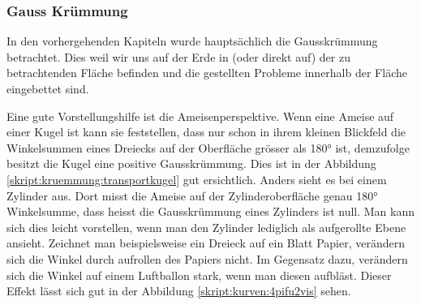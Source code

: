 \begin{refsection}




\subsubsection{Gauss Krümmung}
%
%
%
In den vorhergehenden Kapiteln wurde hauptsächlich die Gausskrümmung betrachtet.
Dies weil wir uns auf der Erde in (oder direkt auf) der zu betrachtenden Fläche befinden und die gestellten Probleme innerhalb der Fläche eingebettet sind.   

Eine gute Vorstellungshilfe ist die Ameisenperspektive. 
Wenn eine Ameise auf einer Kugel ist kann sie feststellen, dass nur schon in ihrem kleinen Blickfeld die Winkelsummen eines Dreiecks auf der Oberfläche grösser als 180° ist, demzufolge besitzt die Kugel eine positive Gausskrümmung. Dies ist in der Abbildung \ref{skript:kruemmung:transportkugel} gut ersichtlich. Anders sieht es bei einem Zylinder aus. Dort misst die Ameise auf der Zylinderoberfläche genau 180° Winkelsumme, dass heisst die Gausskrümmung eines Zylinders ist null. Man kann sich dies leicht vorstellen, wenn man den Zylinder lediglich als aufgerollte Ebene ansieht. Zeichnet man beispielsweise ein Dreieck auf ein Blatt Papier, verändern sich die Winkel durch aufrollen des Papiers nicht. Im Gegensatz dazu, verändern sich die Winkel auf einem Luftballon stark, wenn man diesen aufbläst. Dieser Effekt lässt sich gut in der Abbildung \ref{skript:kurven:4pifu2vis} sehen.


\end{refsection}
